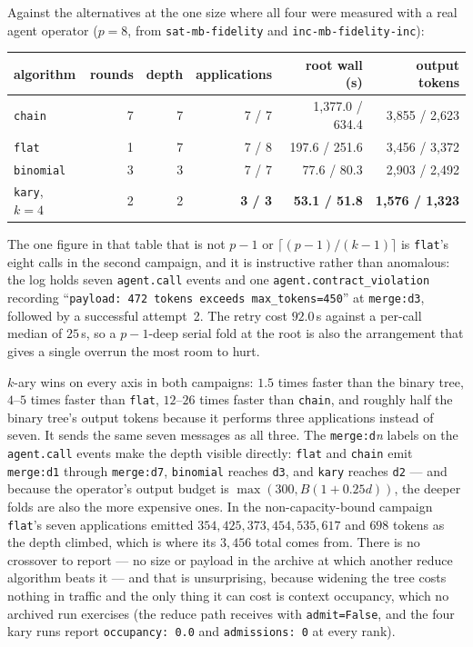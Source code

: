 \documentclass[11pt]{article}
\begin{document}
Against the alternatives at the one size where all four were measured with a real agent
operator ($p=8$, from \texttt{sat-mb-fidelity} and \texttt{inc-mb-fidelity-inc}):

\begin{center}\small
\begin{tabular}{@{}lrrrrr@{}}
\toprule
algorithm & rounds & depth & applications & root wall (s) & output tokens \\
\midrule
\texttt{chain} & 7 & 7 & 7 / 7 & 1{,}377.0 / 634.4 & 3{,}855 / 2{,}623 \\
\texttt{flat} & 1 & 7 & 7 / 8 & 197.6 / 251.6 & 3{,}456 / 3{,}372 \\
\texttt{binomial} & 3 & 3 & 7 / 7 & 77.6 / 80.3 & 2{,}903 / 2{,}492 \\
\texttt{kary}, $k{=}4$ & 2 & 2 & \textbf{3 / 3} & \textbf{53.1 / 51.8} & \textbf{1{,}576 / 1{,}323} \\
\bottomrule
\end{tabular}
\end{center}

The one figure in that table that is not $p-1$ or $\lceil (p-1)/(k-1) \rceil$ is \texttt{flat}'s
eight calls in the second campaign, and it is instructive rather than anomalous: the log holds
seven \texttt{agent.call} events and one \texttt{agent.contract\_violation} recording
``\texttt{payload: 472 tokens exceeds max\_tokens=450}'' at \texttt{merge:d3}, followed by a
successful attempt~2. The retry cost $92.0$\,s against a per-call median of $25$\,s, so a
$p-1$-deep serial fold at the root is also the arrangement that gives a single overrun the most
room to hurt.

$k$-ary wins on every axis in both campaigns: $1.5$ times faster than the binary tree, $4$--$5$
times faster than \texttt{flat}, $12$--$26$ times faster than \texttt{chain}, and roughly half
the binary tree's output tokens because it performs three applications instead of seven. It
sends the same seven messages as all three. The \texttt{merge:d}\emph{n} labels on the
\texttt{agent.call} events make the depth visible directly: \texttt{flat} and \texttt{chain}
emit \texttt{merge:d1} through \texttt{merge:d7}, \texttt{binomial} reaches \texttt{d3}, and
\texttt{kary} reaches \texttt{d2} --- and because the operator's output budget is
$\max(300, B(1 + 0.25d))$, the deeper folds are also the more expensive ones. In the
non-capacity-bound campaign \texttt{flat}'s seven applications emitted $354, 425, 373, 454,
535, 617$ and $698$ tokens as the depth climbed, which is where its $3{,}456$ total comes from. There is no crossover to report --- no size or
payload in the archive at which another reduce algorithm beats it --- and that is unsurprising,
because widening the tree costs nothing in traffic and the only thing it can cost is context
occupancy, which no archived run exercises (the reduce path receives with
\texttt{admit=False}, and the four kary runs report \texttt{occupancy: 0.0} and
\texttt{admissions: 0} at every rank).
\end{document}
